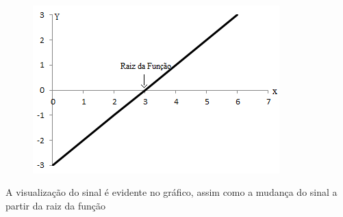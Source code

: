 \begin{texemplo}
\begin{figure}[H]
	\begin{Center}
		\includegraphics[width=3.75in,height=2.56in]{capitulos/funcao_do_primeiro_grau/media/image13.png}
	\end{Center}
\end{figure}

A visualização do sinal é evidente no gráfico, assim como a mudança do sinal a partir da raiz da função  \qedsymbol{}
\end{texemplo}

